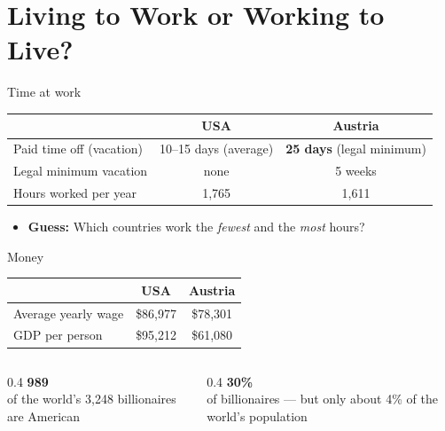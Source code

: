 \documentclass[aspectratio=169,11pt]{beamer}
\begin{document}
\section{Living to Work or Working to Live?}

\begin{frame}{Time at work}
  \centering
  \renewcommand{\arraystretch}{1.5}
  \begin{tabular}{@{}lcc@{}}
    \toprule
    & \textbf{\color{oldblue}USA} & \textbf{\color{austria}Austria} \\
    \midrule
    Paid time off (vacation) & 10--15 days (average) & \textbf{25 days} (legal minimum) \\
    Legal minimum vacation & \alert{none} & 5 weeks \\
    Hours worked per year & 1,765 & 1,611 \\
    \bottomrule
  \end{tabular}

  \vspace{2em}
  \begin{itemize}
    \item \textbf{Guess:} Which countries work the \emph{fewest} and the \emph{most} hours?
  \end{itemize}
\end{frame}

\begin{frame}{Money}
  \centering
  \renewcommand{\arraystretch}{1.5}
  \begin{tabular}{@{}lcc@{}}
    \toprule
    & \textbf{\color{oldblue}USA} & \textbf{\color{austria}Austria} \\
    \midrule
    Average yearly wage & \$86,977 & \$78,301 \\
    GDP per person & \$95,212 & \$61,080 \\
    \bottomrule
  \end{tabular}

  \vspace{2.5em}
  \pause
  \begin{columns}[c]
    \begin{column}{0.4\textwidth}
      \centering
      {\fontsize{40}{44}\selectfont\bfseries\color{oldred} 989}\\[0.2em]
      {\small of the world's 3,248 billionaires are American}
    \end{column}
    \begin{column}{0.4\textwidth}
      \centering
      {\fontsize{40}{44}\selectfont\bfseries\color{navy} 30\%}\\[0.2em]
      {\small of billionaires --- but only about 4\% of the world's population}
    \end{column}
  \end{columns}
\end{frame}
\end{document}
